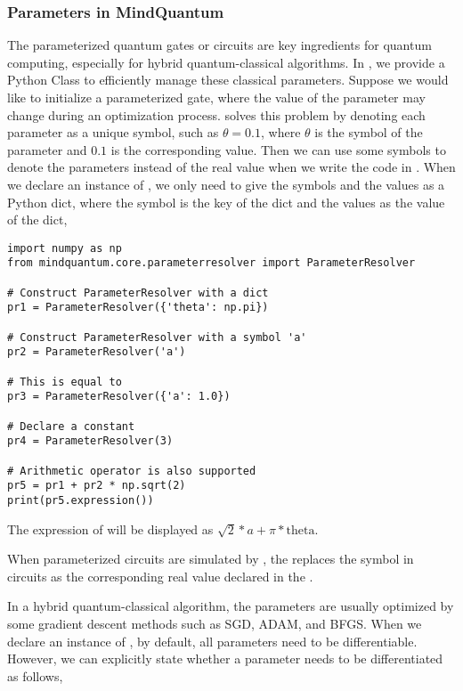 \subsubsection{Parameters in MindQuantum}
The parameterized quantum gates or circuits are key ingredients for quantum computing, especially for hybrid quantum-classical algorithms.
In \MindQuantum, we provide a Python Class  to efficiently manage these classical parameters.
Suppose we would like to initialize a parameterized gate, where the value of the parameter may change during an optimization process.
\ParameterResolver solves this problem by
denoting each parameter as a unique symbol, such as $\theta=0.1$, where $\theta$ is the symbol of the parameter and $0.1$ is the corresponding value.
Then we can use some symbols to denote the parameters instead of the real value when we write the code in \MindQuantum.
When we declare an instance of \ParameterResolver, we only need to give the symbols and the values as a Python dict, where the symbol is the key of the dict and the values as the value of the dict,

\begin{lstlisting}
import numpy as np
from mindquantum.core.parameterresolver import ParameterResolver

# Construct ParameterResolver with a dict
pr1 = ParameterResolver({'theta': np.pi})

# Construct ParameterResolver with a symbol 'a'
pr2 = ParameterResolver('a')

# This is equal to
pr3 = ParameterResolver({'a': 1.0})

# Declare a constant
pr4 = ParameterResolver(3)

# Arithmetic operator is also supported
pr5 = pr1 + pr2 * np.sqrt(2)
print(pr5.expression())
\end{lstlisting}

The expression of  will be displayed as $\sqrt{2}*a + \pi*\text{theta}$.

When parameterized circuits are simulated by \MindQuantum, the \ParameterResolver replaces the symbol in circuits as the corresponding real value declared in the \ParameterResolver.

In a hybrid quantum-classical algorithm, the parameters are usually optimized by some gradient descent methods such as SGD, ADAM, and BFGS. When we declare an instance of \ParameterResolver, by default, all parameters need to be differentiable.
However, we can explicitly state whether a parameter needs to be differentiated as follows,

